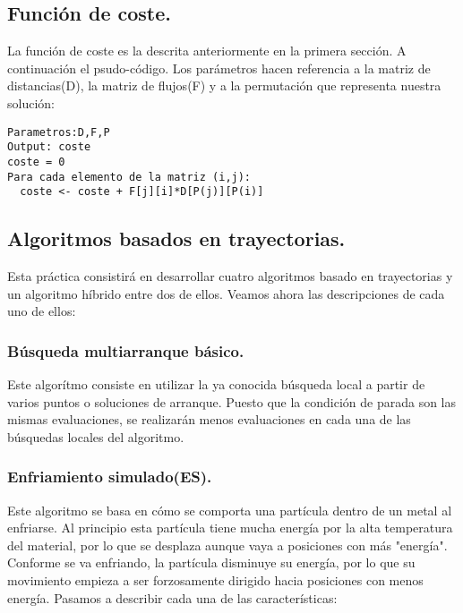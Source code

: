 \subsection{Función de coste.}

La función de coste es la descrita anteriormente en la primera sección. A continuación el psudo-código. Los parámetros hacen referencia a la matriz de distancias(D), la matriz de flujos(F) y a la permutación que representa nuestra solución:\\

\begin{lstlisting}
Parametros:D,F,P
Output: coste
coste = 0
Para cada elemento de la matriz (i,j):
  coste <- coste + F[j][i]*D[P(j)][P(i)]
\end{lstlisting}


\subsection{Algoritmos basados en trayectorias.}

Esta práctica consistirá en desarrollar cuatro algoritmos basado en trayectorias y un algoritmo híbrido entre dos de ellos. Veamos ahora las descripciones de cada uno de ellos:\\

\subsubsection{Búsqueda multiarranque básico.}

Este algorítmo consiste en utilizar la ya conocida búsqueda local a partir de varios puntos o soluciones de arranque. Puesto que la condición de parada son las mismas evaluaciones, se realizarán menos evaluaciones en cada una de las búsquedas locales del algoritmo. 

\subsubsection{Enfriamiento simulado(ES).}

Este algoritmo se basa en cómo  se comporta una partícula dentro de un metal al enfriarse. Al principio esta partícula tiene mucha energía por la alta temperatura del material, por lo que se desplaza aunque vaya a posiciones con más "energía". Conforme se va enfriando, la partícula disminuye su energía, por lo que su movimiento empieza a ser forzosamente dirigido hacia posiciones con menos energía. Pasamos a describir cada una de las características:


